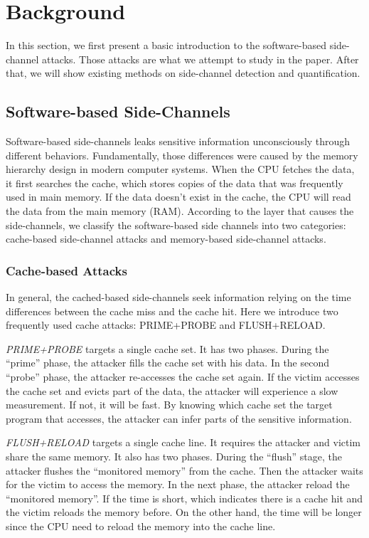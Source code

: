 \section{Background}
In this section, we first present a basic introduction to the 
software-based side-channel attacks. Those attacks 
are what we attempt to study in the paper. After that, we 
will show existing methods on side-channel detection and quantification.

\subsection{Software-based Side-Channels}
Software-based side-channels %
leaks sensitive information unconsciously through different 
behaviors. %
Fundamentally, those differences were caused by the memory hierarchy design 
in modern computer systems. When the CPU fetches the data, it first searches
the cache, which stores copies of the data that was 
frequently used in main memory. If the data doesn't exist in the cache, 
the CPU will read the data from the main memory (RAM). 
According to the layer that causes the side-channels, we classify
the software-based side channels into two categories: 
cache-based side-channel attacks and memory-based side-channel attacks.

\subsubsection{Cache-based Attacks}
In general, the cached-based side-channels seek 
information relying on the time differences between the cache miss
and the cache hit. Here we introduce two frequently used cache attacks:
PRIME+PROBE and FLUSH+RELOAD.

\textit{PRIME+PROBE} targets a single cache set. It has two phases. During the
``prime'' phase, the attacker fills the cache set with his data.
In the second ``probe'' phase, the attacker re-accesses the cache set
again. If the victim accesses the cache set and evicts part of 
the data, the attacker will experience a slow measurement. If not, 
it will be fast. By knowing which cache set the target
program that accesses, the attacker can infer parts of
the sensitive information.

\textit{FLUSH+RELOAD} targets a single cache line. 
It requires the attacker and victim share the same memory.
It also has two phases. During the ``flush'' stage, the attacker 
flushes the ``monitored memory'' from the cache. Then the attacker
waits for the victim to access the memory. In the next phase, the 
attacker reload the ``monitored memory''. If the time is short, which
indicates there is a cache hit and the victim reloads the memory before. 
On the other hand, the time will be longer since the CPU need to reload
the memory into the cache line. 

